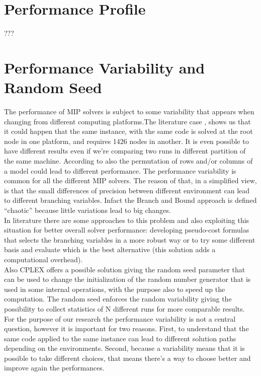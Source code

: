 \begin{appendices}
\chapter{Performance Profile}
???

\chapter{Performance Variability and Random Seed}
The performance of MIP solvers is subject to some variability that appears when changing from different computing platforms.The literature case \cite{danna2008performance}, shows us that it could happen that the same instance, with the same code is solved at the root node in one platform, and requires 1426 nodes in another. It is even possible to have different results even if we’re comparing two runs in different partition of the same machine. According to \cite{lodi2013performance} also the permutation of rows and/or columns of a model could lead to different performance. The performance variability is common for all the different MIP solvers. 
The reason of that, in a simplified view, is that the small differences of precision between different environment can lead to different branching variables. Infact the Branch and Bound approach is defined “chaotic” because little variations lead to big changes. \\
In literature there are some approaches to this problem and also exploiting this situation for better overall solver performance: developing pseudo-cost formulas that selects the branching variables in a more robust way or to try some different basis and evaluate which is the best alternative (this solution adds a computational overhead). \\
Also CPLEX offers a possible solution giving the random seed parameter that can be used to change the initialization of the random number generator that is used in some internal operations, with the purpose also to speed up the computation. The random seed  enforces the random variability giving the possibility to collect statistics of N different runs for more comparable results. \\
For the purpose of our research the performance variability is not a central question, however it is important for two reasons. First, to understand that the same code applied to the same instance can lead to different solution paths depending on the environments. Second, because a variability means that it is possible to take different choices, that means there’s a way to choose better and improve again the performances. 














\end{appendices}



